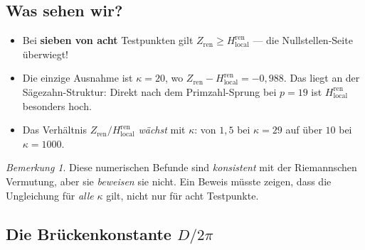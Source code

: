 \documentclass[11pt,a4paper]{article}
\theoremstyle{plain}
\theoremstyle{definition}
\theoremstyle{remark}
\newtheorem{remark}[theorem]{Bemerkung}
\newcommand{\Zren}{Z_{\mathrm{ren}}}
\newcommand{\Hren}{H_{\mathrm{local}}^{\mathrm{ren}}}
\begin{document}
	\subsection{Was sehen wir?}
	
	\begin{itemize}
		\item Bei \textbf{sieben von acht} Testpunkten gilt $\Zren \geq \Hren$
		--- die Nullstellen-Seite \"uberwiegt!
		\item Die einzige Ausnahme ist $\kappa = 20$, wo $\Zren - \Hren = -0{,}988$.
		Das liegt an der S\"agezahn-Struktur: Direkt nach dem Primzahl-Sprung bei
		$p = 19$ ist $\Hren$ besonders hoch.
		\item Das Verh\"altnis $\Zren / \Hren$ \emph{w\"achst} mit $\kappa$:
		von $1{,}5$ bei $\kappa = 29$ auf \"uber $10$ bei $\kappa = 1000$.
	\end{itemize}
	
	\begin{center}
	\end{center}
	
	\begin{remark}
		Diese numerischen Befunde sind \emph{konsistent} mit der Riemannschen
		Vermutung, aber sie \emph{beweisen} sie nicht. Ein Beweis m\"usste
		zeigen, dass die Ungleichung f\"ur \emph{alle} $\kappa$ gilt, nicht
		nur f\"ur acht Testpunkte.
	\end{remark}
	
	\subsection{Die Br\"uckenkonstante $D/2\pi$}
	
\end{document}
